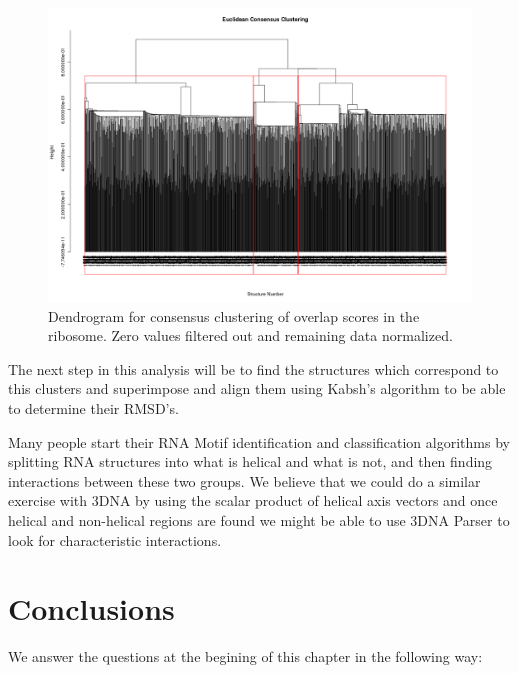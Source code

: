 \documentclass[10pt, oneside, pdftex]{article}
\begin{document}
\begin{figure}[htbp]
\centering 
\includegraphics[angle=90, scale=0.6]{eucli_cons.png}
\caption{Dendrogram for consensus clustering  of overlap scores in the
  ribosome.  Zero values filtered out and remaining data normalized.}
\end{figure}

The next  step in this analysis  will be to find  the structures which
correspond  to this  clusters  and superimpose  and  align them  using
Kabsh's algorithm to be able to determine their RMSD's.

Many people  start their  RNA Motif identification  and classification
algorithms by splitting  RNA structures into what is  helical and what
is not,  and then  finding interactions between  these two  groups. We
believe that  we could do  a similar exercise  with 3DNA by  using the
scalar  product   of  helical  axis  vectors  and   once  helical  and
non-helical regions are  found we might be able to  use 3DNA Parser to
look for characteristic interactions.


\section{Conclusions}
We  answer  the questions  at  the begining  of  this  chapter in  the
following way:
\end{document}
